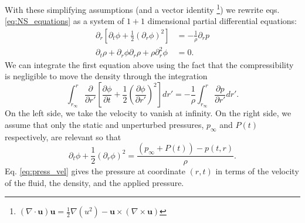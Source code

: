 \documentclass[rmp,aps,nofootinbib,superscriptaddress,floatfix]{revtex4-2}
\begin{document}
With these simplifying assumptions (and a vector identity \footnote{$\left( \nabla \cdot \bm{u} \right) \bm{u} = \frac{1}{2} \nabla (u^2) - \bm{u}\times \left( \nabla \times \bm{u} \right)$}) we rewrite eqs. \ref{eq:NS_equations} as a system of $1+1$ dimensional partial differential equations: 
\begin{equation}
\begin{split}
     \partial_r \left[ \partial_t \phi +\frac{1}{2} \left( \partial_r \phi \right)^2 \right] & = - \frac{1}{\rho} \partial_r p  \\ 
     \partial_t \rho+ \partial_r \phi \partial_r \rho + \rho \partial^2_r \phi & = 0.
     \label{eq:NS_1D}
\end{split}
\end{equation}
We can integrate the first equation above using the fact that the compressibility is negligible to move the density through the integration \cite{leighton2007derivation}
\begin{equation}
    \int_{r_\infty}^{r} \frac{\partial}{\partial r'} \left[ \frac{\partial \phi}{\partial t} +\frac{1}{2} \left( \frac{\partial \phi}{\partial r'} \right)^2 \right] dr' = - \frac{1}{\rho} \int_{r_\infty}^{r} \frac{\partial p}{\partial r'} dr'.
\end{equation}
On the left side, we take the velocity to vanish at infinity. On the right side, we assume that only the static and unperturbed pressures, $p_\infty$ and $P(t)$ respectively, are relevant so that \cite{prosperetti1999old,prosperetti1986bubble,leighton2007derivation} 
\begin{equation}
    \partial_t \phi + \frac{1}{2}\left( \partial_r \phi \right)^2 = \frac{(p_\infty+P(t))-p(t,r)}{\rho}.
    \label{eq:press_vel}
\end{equation}
Eq. \ref{eq:press_vel} gives the pressure at coordinate $(r,t)$ in terms of the velocity of the fluid, the density, and the applied pressure. 
\end{document}
